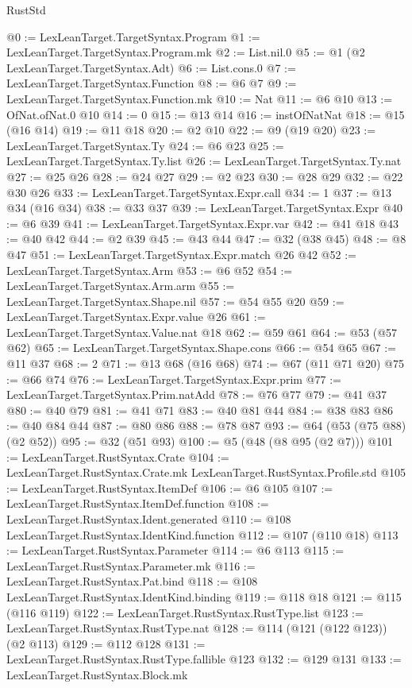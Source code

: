 \begin{lexlean}{RustStd}
\begin{coremodule}
@0 := LexLeanTarget.TargetSyntax.Program
@1 := LexLeanTarget.TargetSyntax.Program.mk
@2 := List.nil.{0}
@5 := @1 (@2 LexLeanTarget.TargetSyntax.Adt)
@6 := List.cons.{0}
@7 := LexLeanTarget.TargetSyntax.Function
@8 := @6 @7
@9 := LexLeanTarget.TargetSyntax.Function.mk
@10 := Nat
@11 := @6 @10
@13 := OfNat.ofNat.{0} @10
@14 := 0
@15 := @13 @14
@16 := instOfNatNat
@18 := @15 (@16 @14)
@19 := @11 @18
@20 := @2 @10
@22 := @9 (@19 @20)
@23 := LexLeanTarget.TargetSyntax.Ty
@24 := @6 @23
@25 := LexLeanTarget.TargetSyntax.Ty.list
@26 := LexLeanTarget.TargetSyntax.Ty.nat
@27 := @25 @26
@28 := @24 @27
@29 := @2 @23
@30 := @28 @29
@32 := @22 @30 @26
@33 := LexLeanTarget.TargetSyntax.Expr.call
@34 := 1
@37 := @13 @34 (@16 @34)
@38 := @33 @37
@39 := LexLeanTarget.TargetSyntax.Expr
@40 := @6 @39
@41 := LexLeanTarget.TargetSyntax.Expr.var
@42 := @41 @18
@43 := @40 @42
@44 := @2 @39
@45 := @43 @44
@47 := @32 (@38 @45)
@48 := @8 @47
@51 := LexLeanTarget.TargetSyntax.Expr.match @26 @42
@52 := LexLeanTarget.TargetSyntax.Arm
@53 := @6 @52
@54 := LexLeanTarget.TargetSyntax.Arm.arm
@55 := LexLeanTarget.TargetSyntax.Shape.nil
@57 := @54 @55 @20
@59 := LexLeanTarget.TargetSyntax.Expr.value @26
@61 := LexLeanTarget.TargetSyntax.Value.nat @18
@62 := @59 @61
@64 := @53 (@57 @62)
@65 := LexLeanTarget.TargetSyntax.Shape.cons
@66 := @54 @65
@67 := @11 @37
@68 := 2
@71 := @13 @68 (@16 @68)
@74 := @67 (@11 @71 @20)
@75 := @66 @74
@76 := LexLeanTarget.TargetSyntax.Expr.prim
@77 := LexLeanTarget.TargetSyntax.Prim.natAdd
@78 := @76 @77
@79 := @41 @37
@80 := @40 @79
@81 := @41 @71
@83 := @40 @81 @44
@84 := @38 @83
@86 := @40 @84 @44
@87 := @80 @86
@88 := @78 @87
@93 := @64 (@53 (@75 @88) (@2 @52))
@95 := @32 (@51 @93)
@100 := @5 (@48 (@8 @95 (@2 @7)))
@101 := LexLeanTarget.RustSyntax.Crate
@104 := LexLeanTarget.RustSyntax.Crate.mk LexLeanTarget.RustSyntax.Profile.std
@105 := LexLeanTarget.RustSyntax.ItemDef
@106 := @6 @105
@107 := LexLeanTarget.RustSyntax.ItemDef.function
@108 := LexLeanTarget.RustSyntax.Ident.generated
@110 := @108 LexLeanTarget.RustSyntax.IdentKind.function
@112 := @107 (@110 @18)
@113 := LexLeanTarget.RustSyntax.Parameter
@114 := @6 @113
@115 := LexLeanTarget.RustSyntax.Parameter.mk
@116 := LexLeanTarget.RustSyntax.Pat.bind
@118 := @108 LexLeanTarget.RustSyntax.IdentKind.binding
@119 := @118 @18
@121 := @115 (@116 @119)
@122 := LexLeanTarget.RustSyntax.RustType.list
@123 := LexLeanTarget.RustSyntax.RustType.nat
@128 := @114 (@121 (@122 @123)) (@2 @113)
@129 := @112 @128
@131 := LexLeanTarget.RustSyntax.RustType.fallible @123
@132 := @129 @131
@133 := LexLeanTarget.RustSyntax.Block.mk

\end{coremodule}
\end{lexlean}
